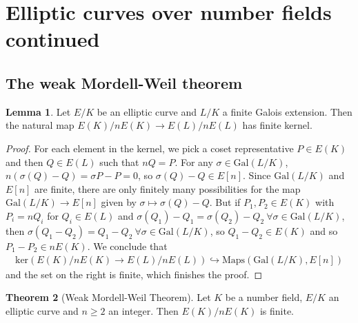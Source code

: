 \documentclass{article}
\theoremstyle{definition}
\newtheorem{theorem}{Theorem}[section]
\newtheorem{lemma}[theorem]{Lemma}
\begin{document}
\section{Elliptic curves over number fields continued}
\subsection{The weak Mordell-Weil theorem}
\begin{lemma}\label{lemma12.1}
    Let $E/K$ be an elliptic curve and $L/K$ a finite Galois extension. Then the natural map $E(K)/nE(K) \to E(L)/nE(L)$ has finite kernel.
\end{lemma}
\begin{proof}
    For each element in the kernel, we pick a coset representative $P \in E(K)$ and then $Q \in E(L)$ such that $nQ=P$. For any $\sigma \in \text{Gal}(L/K)$, $n(\sigma(Q)-Q) = \sigma P - P = 0$, so $\sigma(Q)-Q \in E[n]$. Since $\text{Gal}(L/K)$ and $E[n]$ are finite, there are only finitely many possibilities for the map $\text{Gal}(L/K) \to E[n]$ given by $\sigma \mapsto \sigma(Q)-Q$. But if $P_1,P_2 \in E(K)$ with $P_i = nQ_i$ for $Q_i \in E(L)$ and $\sigma(Q_1)-Q_1=\sigma(Q_2)-Q_2 ~\forall \sigma \in \text{Gal}(L/K)$, then $\sigma(Q_1-Q_2)=Q_1-Q_2 ~\forall \sigma \in\text{Gal}(L/K)$, so $Q_1-Q_2 \in E(K)$ and so $P_1-P_2 \in nE(K)$. We conclude that
    \begin{align*}
        \text{ker}(E(K)/nE(K) \to E(L)/nE(L)) \hookrightarrow \text{Maps}(\text{Gal}(L/K),E[n])
    \end{align*}
    and the set on the right is finite, which finishes the proof.
\end{proof}
\begin{theorem}[Weak Mordell-Weil Theorem]\label{theorem12.2}
    Let $K$ be a number field, $E/K$ an elliptic curve and $n\ge 2$ an integer. Then $E(K)/nE(K)$ is finite.
\end{theorem}
\end{document}
